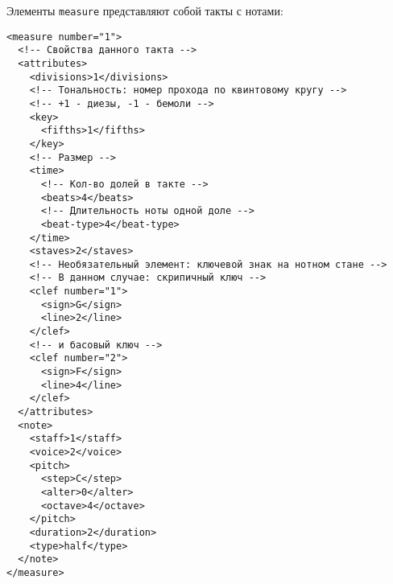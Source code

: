 \documentclass[12pt]{article}
\begin{document}
Элементы {\tt measure} представляют собой такты с нотами:

\begin{verbatim}
<measure number="1">
  <!-- Свойства данного такта -->
  <attributes>
    <divisions>1</divisions>
    <!-- Тональность: номер прохода по квинтовому кругу -->
    <!-- +1 - диезы, -1 - бемоли -->
    <key>
      <fifths>1</fifths>
    </key>
    <!-- Размер -->
    <time>
      <!-- Кол-во долей в такте -->
      <beats>4</beats>
      <!-- Длительность ноты одной доле -->
      <beat-type>4</beat-type>
    </time>
    <staves>2</staves>
    <!-- Необязательный элемент: ключевой знак на нотном стане -->
    <!-- В данном случае: скрипичный ключ -->
    <clef number="1">
      <sign>G</sign>
      <line>2</line>
    </clef>
    <!-- и басовый ключ -->
    <clef number="2">
      <sign>F</sign>
      <line>4</line>
    </clef>
  </attributes>
  <note>
    <staff>1</staff>
    <voice>2</voice>
    <pitch>
      <step>C</step>
      <alter>0</alter>
      <octave>4</octave>
    </pitch>
    <duration>2</duration>
    <type>half</type>
  </note>
</measure>
\end{verbatim}
\end{document}
